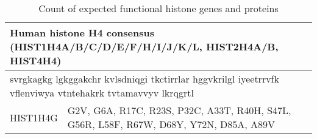 \begin{table}
  \centering
  \begin{tabular}{l | l}
    \multicolumn{2}{l}{Human histone H4 consensus (HIST1H4A/B/C/D/E/F/H/I/J/K/L, HIST2H4A/B, HIST4H4)} \\
    \hline
    \multicolumn{2}{l}{svrgkagkg lgkggakchr kvlsdniqgi tkctirrlar hggvkrilgl iyeetrrvfk vflenviwya vtntehakrk tvtamavvyv lkrqgrtl} \\
    \hline
    HIST1H4G   & G2V, G6A, R17C, R23S, P32C, A33T, R40H, S47L, G56R, L58F, R67W, D68Y, Y72N, D85A, A89V \\
  \end{tabular}
  \caption{Count of expected functional histone genes and proteins}
  \label{tab:H4-consensus}
\end{table}
